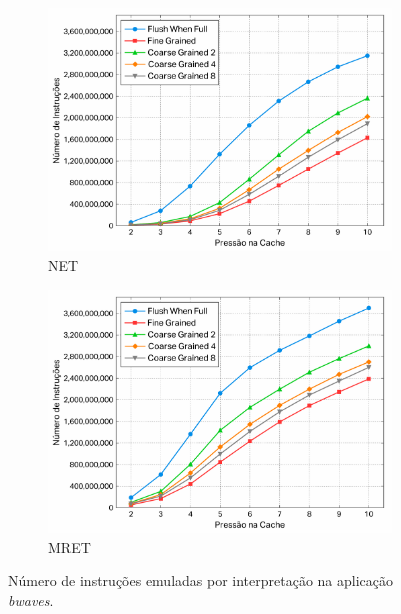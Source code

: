 \documentclass[12pt,twoside]{article}
\begin{document}
\begin{figure}[!ht]
        \centering
        \begin{subfigure}[b]{0.48\textwidth}
                \includegraphics[width=\textwidth]{./figs/net-bwaves-freq-int}
                \caption{NET}
                \label{fig-net-bwaves-freq-int}
        \end{subfigure}
        \quad
                \begin{subfigure}[b]{0.48\textwidth}
                \includegraphics[width=\textwidth]{./figs/mret-bwaves-freq-int}
                \caption{MRET}
                \label{fig-mret-bwaves-freq-int}
        \end{subfigure}
\caption{Número de instruções emuladas por interpretação na aplicação \emph{bwaves}.}
\label{fig:freq_nte}
\end{figure}
\end{document}
